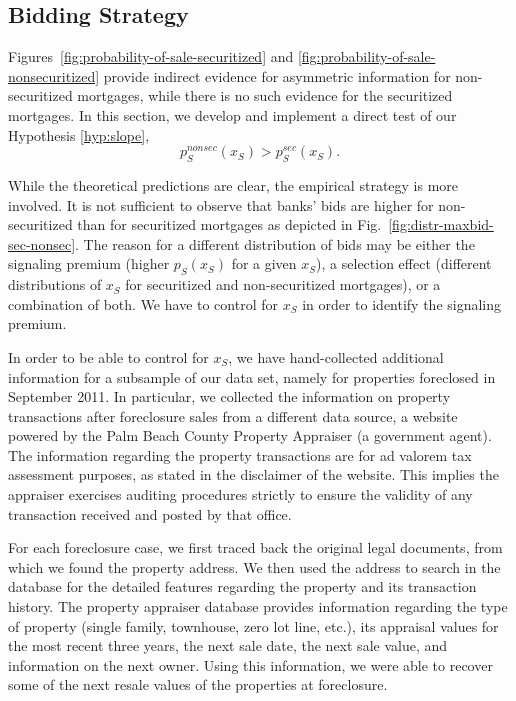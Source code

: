 \documentclass[11pt,twopage]{article}
\begin{document}

\subsection{Bidding Strategy}

Figures~\ref{fig:probability-of-sale-securitized} and
\ref{fig:probability-of-sale-nonsecuritized} provide indirect evidence
for asymmetric information for non-securitized mortgages, while
there is no such evidence for the securitized mortgages. In this
section, we develop and implement a direct test of our Hypothesis
\ref{hyp:slope},
\[ p_S^{nonsec}(x_S) > p_S^{sec}(x_S).\]

While the theoretical predictions are clear, the empirical strategy is
more involved. It is not sufficient to observe that banks' bids are
higher for non-securitized than for securitized mortgages as depicted
in Fig.~\ref{fig:distr-maxbid-sec-nonsec}. The reason for a different
distribution of bids may be either the signaling premium (higher
$p_S(x_S)$ for a given $x_S$), a selection effect (different
distributions of $x_S$ for securitized and non-securitized mortgages),
or a combination of both. We have to control for $x_S$ in order to
identify the signaling premium.


In order to be able to control for $x_S$, we have hand-collected
additional information for a subsample of our data set, namely for
properties foreclosed in September 2011. In particular, we collected
the information on property transactions after foreclosure sales from
a different data source, a website powered by the Palm Beach County
Property Appraiser (a government agent). The information regarding the
property transactions are for ad valorem tax assessment purposes, as
stated in the disclaimer of the website. This implies the appraiser
exercises auditing procedures strictly to ensure the validity of any
transaction received and posted by that office.

For each foreclosure case, we first traced back the original legal
documents, from which we found the property address. We then used the
address to search in the database for the detailed features regarding
the property and its transaction history. The property appraiser
database provides information regarding the type of property (single
family, townhouse, zero lot line, etc.), its appraisal values for the
most recent three years, the next sale date, the next sale value, and
information on the next owner. Using this information, we were able to
recover some of the next resale values of the properties at
foreclosure.
\end{document}
